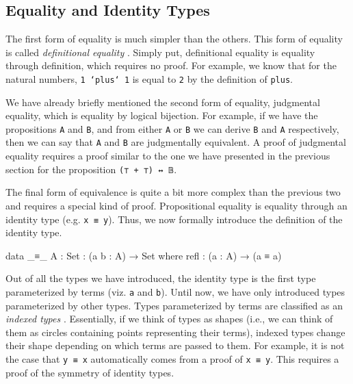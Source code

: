 \documentclass[12pt]{article}
\begin{document}
\subsection*{Equality and Identity Types}
The first form of equality is much simpler than the others. This form of
equality is called {\it definitional equality} \cite{}. Simply put, definitional
equality is equality through definition, which requires no proof. For example,
we know that for the natural numbers, {\tt 1 `plus` 1} is equal to {\tt 2} by
the definition of {\tt plus}.

We have already briefly mentioned the second form of equality, judgmental
equality, which is equality by logical bijection. For example, if we have the
propositions {\tt A} and {\tt B}, and from either {\tt A} or {\tt B} we can
derive {\tt B} and {\tt A} respectively, then we can say that {\tt A} and
{\tt B} are judgmentally equivalent. A proof of judgmental equality requires a
proof similar to the one we have presented in the previous section for the
proposition {\tt (⊤ + ⊤) ↔ 𝔹}.

The final form of equivalence is quite a bit more complex than the previous two
and requires a special kind of proof. Propositional equality is equality through
an identity type (e.g. {\tt x ≡ y}). Thus, we now formally introduce the
definition of the identity type.
\begin{center}
\begin{minipage}{0.9\textwidth}
\begin{code}
data _≡_ {A : Set} : (a b : A) → Set where
  refl : (a : A) → (a ≡ a)
\end{code}
\end{minipage}
\end{center}
Out of all the types we have introduced, the identity type is the first type
parameterized by terms (viz. {\tt a} and {\tt b}). Until now, we have only
introduced types parameterized by other types. Types parameterized by terms are
classified as an {\em indexed types} \cite{}. Essentially, if we think of types
as shapes (i.e., we can think of them as circles containing points representing
their terms), indexed types change their shape depending on which terms are
passed to them. For example, it is not the case that {\tt y ≡ x} automatically
comes from a proof of {\tt x ≡ y}. This requires a proof of the symmetry of
identity types.
\end{document}
